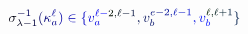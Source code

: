 \documentclass[12pt]{article}
\begin{document}
\makeatletter
\renewcommand*{\@textcolor}[3]{%
  \protect\leavevmode
  \begingroup
    \color#1{#2}#3%
  \endgroup
}
\makeatother
\begin{displaymath}
\mathcolor[RGB]{0,0,15}{\sigma} _ { \mathcolor[RGB]{0,0,30}{\lambda} \mathcolor[RGB]{0,0,45}{-} \mathcolor[RGB]{0,0,60}{1} } ^ { \mathcolor[RGB]{0,0,75}{-} \mathcolor[RGB]{0,0,90}{1} } \mathcolor[RGB]{0,0,105}{(} \mathcolor[RGB]{0,0,120}{\kappa} _ { \mathcolor[RGB]{0,0,135}{a} } ^ { \mathcolor[RGB]{0,0,150}{\ell} } \mathcolor[RGB]{0,0,165}{)} \mathcolor[RGB]{0,0,180}{\in} \mathcolor[RGB]{0,0,195}{\{} \mathcolor[RGB]{0,0,210}{v} _ { \mathcolor[RGB]{0,0,225}{a} } ^ { \mathcolor[RGB]{0,0,240}{\ell} \mathcolor[RGB]{0,0,255}{-} \mathcolor[RGB]{0,15,0}{2} \mathcolor[RGB]{0,15,15}{,} \mathcolor[RGB]{0,15,30}{\ell} \mathcolor[RGB]{0,15,45}{-} \mathcolor[RGB]{0,15,60}{1} } \mathcolor[RGB]{0,15,75}{,} \mathcolor[RGB]{0,15,90}{v} _ { \mathcolor[RGB]{0,15,105}{b} } ^ { \mathcolor[RGB]{0,15,120}{e} \mathcolor[RGB]{0,15,135}{-} \mathcolor[RGB]{0,15,150}{2} \mathcolor[RGB]{0,15,165}{,} \mathcolor[RGB]{0,15,180}{\ell} \mathcolor[RGB]{0,15,195}{-} \mathcolor[RGB]{0,15,210}{1} } \mathcolor[RGB]{0,15,225}{,} \mathcolor[RGB]{0,15,240}{v} _ { \mathcolor[RGB]{0,15,255}{b} } ^ { \mathcolor[RGB]{0,30,0}{\ell} \mathcolor[RGB]{0,30,15}{,} \mathcolor[RGB]{0,30,30}{\ell} \mathcolor[RGB]{0,30,45}{+} \mathcolor[RGB]{0,30,60}{1} } \mathcolor[RGB]{0,30,75}{\}}
\end{displaymath}
\end{document}
